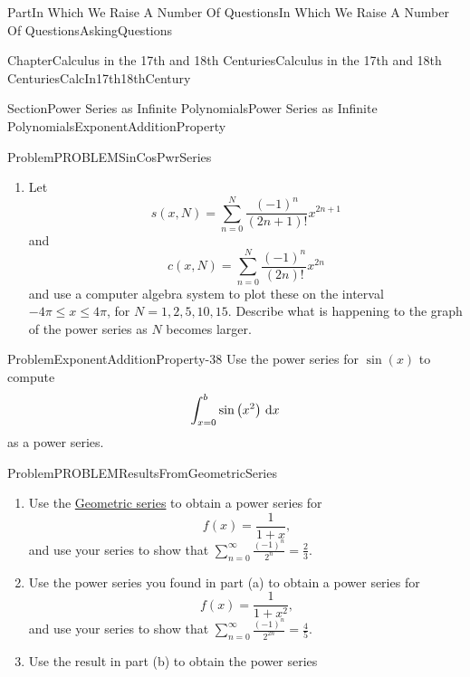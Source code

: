 \documentclass[oneside,10pt,]{book}
\numberwithin{equation}{part}
\newcommand{\dx}[1]{\,{\rm d}#1}
\newcommand{\amp}{&}
\begin{document}
\begin{partptx}{Part}{In Which We Raise A Number Of Questions}{}{In Which We Raise A Number Of Questions}{}{}{AskingQuestions}
\begin{chapterptx}{Chapter}{Calculus in the 17th and 18th Centuries}{}{Calculus in the 17th and 18th Centuries}{}{}{CalcIn17th18thCentury}
\begin{sectionptx}{Section}{Power Series as Infinite Polynomials}{}{Power Series as Infinite Polynomials}{}{}{ExponentAdditionProperty}
\begin{problem}{Problem}{}{PROBLEMSinCosPwrSeries}
\begin{enumerate}[font=\bfseries,label=(\alph*),ref=\alph*]
\begin{align*}
\amp{}=\sum_{n=0}^\infty\frac{\left(-1\right)^n}{\left(2n+1\right)!}x^{2n+1}
\end{align*}
to obtain the power series%
\begin{align*}
\cos
x\amp{}=1-\frac{1}{2!}\,x^2+\frac{1}{4!}x^4-\frac{1}{6!}x^6+\cdots\\
\amp{}=\sum_{n=0}^\infty\frac{\left(-1\right)^n}{\left(2n\right)!}x^{2n}.
\end{align*}
%
\item{}Let%
\begin{equation*}
s(x,N)=\sum_{n=0}^N\frac{\left(-1\right)^n}{\left(2n+1\right)!}x^{2n+1}
\end{equation*}
and%
\begin{equation*}
c(x,N)=\sum_{n=0}^N\frac{\left(-1\right)^n}{\left(2n\right)!}x^{2n}
\end{equation*}
and use a computer algebra system to plot these on the interval \(-4\pi\leq x\leq 4\pi\), for \(N=1,2,5,10,
15\).  Describe what is happening to the graph of the power series as \(N\) becomes larger.%
\end{enumerate}%
\end{problem}
\begin{problem}{Problem}{}{ExponentAdditionProperty-38}%
Use the power series for \(\sin (x)\) to compute%
\begin{equation*}
\int^b_{x=0}\sin\left(x^2\right)\dx{x}
\end{equation*}
as a power series.%
\end{problem}
\begin{problem}{Problem}{}{PROBLEMResultsFromGeometricSeries}%
\begin{enumerate}[font=\bfseries,label=(\alph*),ref=\alph*]%
\item{}Use the \hyperref[EQUATIONGeometricSeries]{Geometric series} to obtain a power series for%
\begin{equation*}
f(x)=\frac{1}{1+x}\text{,}
\end{equation*}
and use your series to show that \(\sum_{n=0}^\infty \frac{(-1)^n}{2^n} = \frac23 \).%
\item{}Use the power series you found  in part (a) to obtain a power series for%
\begin{equation*}
f(x)=\frac{1}{1+x^2}\text{,}
\end{equation*}
and use your series to show that \(\sum_{n=0}^\infty
\frac{(-1)^n}{2^{2n}}=\frac45\).%
\item{}Use the result in part (b) to obtain the power series%
\begin{equation*}

\end{equation*}
\end{enumerate}
\end{problem}
\end{sectionptx}
\end{chapterptx}
\end{partptx}
\end{document}
